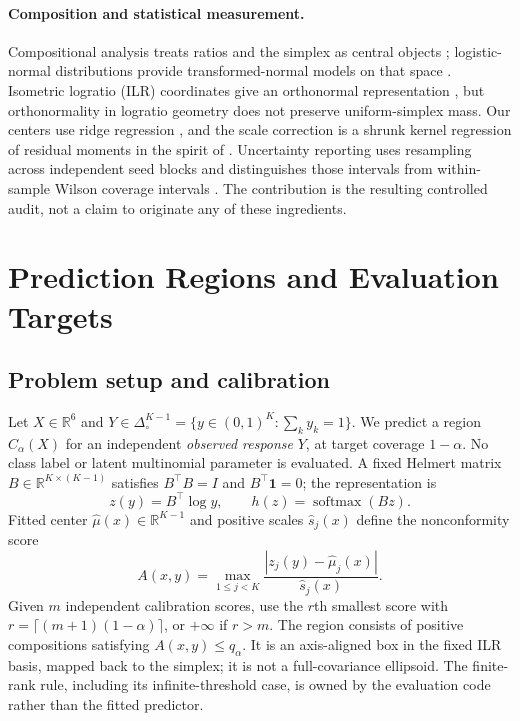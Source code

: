 \documentclass{article}
\newcommand{\R}{\mathbb{R}}
\newcommand{\simplex}{\Delta^{K-1}_{\circ}}
\begin{document}
\paragraph{Composition and statistical measurement.}
Compositional analysis treats ratios and the simplex as central objects \citep{Aitchison1982,Pawlowsky2015}; logistic-normal distributions provide transformed-normal models on that space \citep{Aitchison1980}. Isometric logratio (ILR) coordinates give an orthonormal representation \citep{Egozcue2003}, but orthonormality in logratio geometry does not preserve uniform-simplex mass. Our centers use ridge regression \citep{Hoerl1970}, and the scale correction is a shrunk kernel regression of residual moments in the spirit of \citet{Nadaraya1964}. Uncertainty reporting uses resampling across independent seed blocks \citep{Efron1979,Davison1997} and distinguishes those intervals from within-sample Wilson coverage intervals \citep{Brown2001}. The contribution is the resulting controlled audit, not a claim to originate any of these ingredients.

\section{Prediction Regions and Evaluation Targets}
\label{sec:regions}
\subsection{Problem setup and calibration}
Let $X\in\R^6$ and $Y\in\simplex=\{y\in(0,1)^K:\sum_k y_k=1\}$. We predict a region $C_\alpha(X)$ for an independent \emph{observed response} $Y$, at target coverage $1-\alpha$. No class label or latent multinomial parameter is evaluated. A fixed Helmert matrix $B\in\R^{K\times(K-1)}$ satisfies $B^\top B=I$ and $B^\top\mathbf 1=0$; the representation is
\begin{equation}
 z(y)=B^\top\log y,\qquad h(z)=\operatorname{softmax}(Bz).
\end{equation}
Fitted center $\widehat\mu(x)\in\R^{K-1}$ and positive scales $\widehat s_j(x)$ define the nonconformity score
\begin{equation}
 A(x,y)=\max_{1\leq j<K}\frac{|z_j(y)-\widehat\mu_j(x)|}{\widehat s_j(x)}.
 \label{eq:score}
\end{equation}
Given $m$ independent calibration scores, use the $r$th smallest score with $r=\lceil(m+1)(1-\alpha)\rceil$, or $+\infty$ if $r>m$. The region consists of positive compositions satisfying $A(x,y)\leq q_\alpha$. It is an axis-aligned box in the fixed ILR basis, mapped back to the simplex; it is not a full-covariance ellipsoid. The finite-rank rule, including its infinite-threshold case, is owned by the evaluation code rather than the fitted predictor. %
\end{document}
